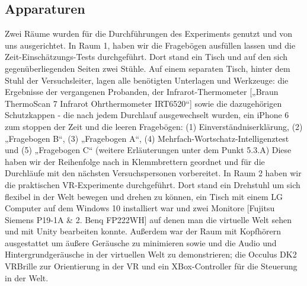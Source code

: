 \documentclass{Bericht}
\begin{document}
\subsection{Apparaturen}
Zwei Räume wurden für die Durchführungen des Experiments genutzt und von uns ausgerichtet.
In Raum 1, haben wir die Fragebögen ausfüllen lassen und die Zeit-Einschätzungs-Tests
durchgeführt. Dort stand ein Tisch und auf den sich gegenüberliegenden Seiten zwei Stühle.
Auf einem separaten Tisch, hinter dem Stuhl der Versuchsleiter, lagen alle benötigten Unterlagen
und Werkzeuge: die Ergebnisse der vergangenen Probanden, der Infrarot-Thermometer
[„Braun ThermoScan 7 Infrarot Ohrthermometer IRT6520“] sowie die dazugehörigen Schutzkappen
- die nach jedem Durchlauf ausgewechselt wurden, ein iPhone 6 zum stoppen der Zeit
und die leeren Fragebögen: (1) Einverständniserklärung, (2) „Fragebogen B“, (3) „Fragebogen
A“, (4) Mehrfach-Wortschatz-Intelligenztest und (5) „Fragebogen C“ (weitere Erläuterungen
unter dem Punkt 5.3.A) Diese haben wir der Reihenfolge nach in Klemmbrettern geordnet und
für die Durchläufe mit den nächsten Versuchspersonen vorbereitet.
In Raum 2 haben wir die praktischen VR-Experimente durchgeführt. Dort stand ein Drehstuhl
um sich flexibel in der Welt bewegen und drehen zu können, ein Tisch mit einem LG Computer
auf dem Windows 10 installiert war und zwei Monitore [Fujitsu Siemens P19-1A \& 2. Benq
FP222WH] auf denen man die virtuelle Welt sehen und mit Unity bearbeiten konnte. Außerdem
war der Raum mit Kopfhörern ausgestattet um äußere Geräusche zu minimieren sowie und die
Audio und Hintergrundgeräusche in der virtuellen Welt zu demonstrieren; die Occulus DK2 VRBrille
zur Orientierung in der VR und ein XBox-Controller für die Steuerung in der Welt.
\end{document}
